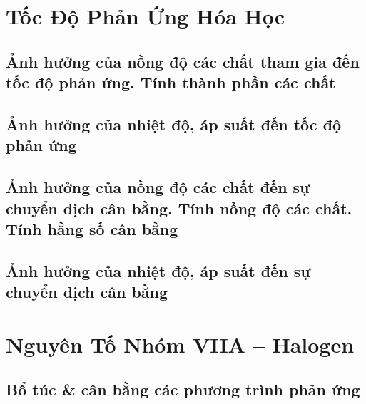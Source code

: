 \documentclass{article}
\numberwithin{equation}{section}
\begin{document}

\section{Tốc Độ Phản Ứng Hóa Học}

\subsection{Ảnh hưởng của nồng độ các chất tham gia đến tốc độ phản ứng. Tính thành phần các chất}


\subsection{Ảnh hưởng của nhiệt độ, áp suất đến tốc độ phản ứng}


\subsection{Ảnh hưởng của nồng độ các chất đến sự chuyển dịch cân bằng. Tính nồng độ các chất. Tính hằng số cân bằng}


\subsection{Ảnh hưởng của nhiệt độ, áp suất đến sự chuyển dịch cân bằng}


\section{Nguyên Tố Nhóm VIIA -- Halogen}

\subsection{Bổ túc \& cân bằng các phương trình phản ứng}

\end{document}
